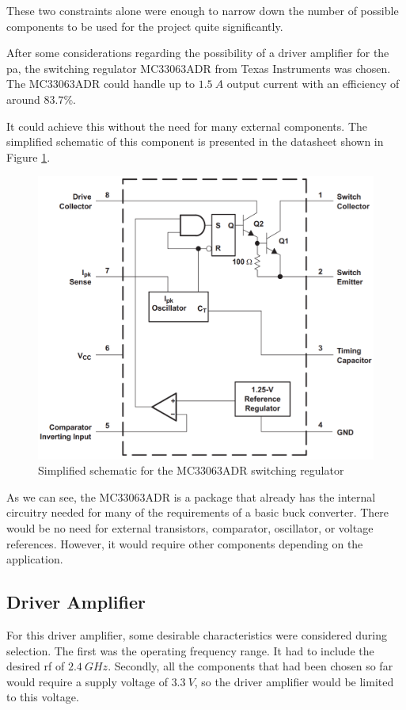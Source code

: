 \par These two constraints alone were enough to narrow down the number of possible components to be used for the project quite significantly.

\par After some considerations regarding the possibility of a driver amplifier for the \ac{pa}, the switching regulator MC33063ADR from Texas Instruments was chosen. The MC33063ADR could handle up to $1.5 \:\si{A}$ output current with an efficiency of around $83.7\%$. 

\par It could achieve this without the need for many external components. The simplified schematic of this component is presented in the datasheet shown in Figure \ref{fig:ch3_smpsInternal.png}.

\begin{figure}[H]
    \vspace*{0cm}
    \centering
    \includegraphics[width=0.6\linewidth]{figs/ch3_smpsInternal.png}
    \caption{Simplified schematic for the MC33063ADR switching regulator \cite{2004MC3x063ARegulators}}
    \label{fig:ch3_smpsInternal.png}
\end{figure}

\par As we can see, the MC33063ADR is a package that already has the internal circuitry needed for many of the requirements of a basic buck converter. There would be no need for external transistors, comparator, oscillator, or voltage references. However, it would require other components depending on the application.

\subsection{Driver Amplifier}
\par For this driver amplifier, some desirable characteristics were considered during selection. The first was the operating frequency range. It had to include the desired \ac{rf} of $2.4 \:\si{GHz}$. Secondly, all the components that had been chosen so far would require a supply voltage of $3.3 \:\si{V}$, so the driver amplifier would be limited to this voltage.

